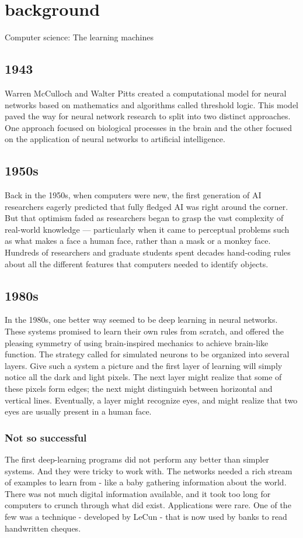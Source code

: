 \section{background}
Computer science: The learning machines
\subsection{1943}
Warren McCulloch and Walter Pitts created a computational model for neural networks based on mathematics and algorithms called threshold logic. This model paved the way for neural network research to split into two distinct approaches. One approach focused on biological processes in the brain and the other focused on the application of neural networks to artificial intelligence.
\subsection{1950s}
Back in the 1950s, when computers were new, the first generation of AI researchers eagerly predicted that fully fledged AI was right around the corner. But that optimism faded as researchers began to grasp the vast complexity of real-world knowledge — particularly when it came to perceptual problems such as what makes a face a human face, rather than a mask or a monkey face. Hundreds of researchers and graduate students spent decades hand-coding rules about all the different features that computers needed to identify objects.
\subsection{1980s}
In the 1980s, one better way seemed to be deep learning in neural networks. These systems promised to learn their own rules from scratch, and offered the pleasing symmetry of using brain-inspired mechanics to achieve brain-like function. The strategy called for simulated neurons to be organized into several layers. Give such a system a picture and the first layer of learning will simply notice all the dark and light pixels. The next layer might realize that some of these pixels form edges; the next might distinguish between horizontal and vertical lines. Eventually, a layer might recognize eyes, and might realize that two eyes are usually present in a human face.
\subsubsection{Not so successful}
The first deep-learning programs did not perform any better than simpler systems. And they were tricky to work with. The networks needed a rich stream of examples to learn from - like a baby gathering information about the world. There was not much digital information available, and it took too long for computers to crunch through what did exist. Applications were rare. One of the few was a technique - developed by LeCun - that is now used by banks to read handwritten cheques.
